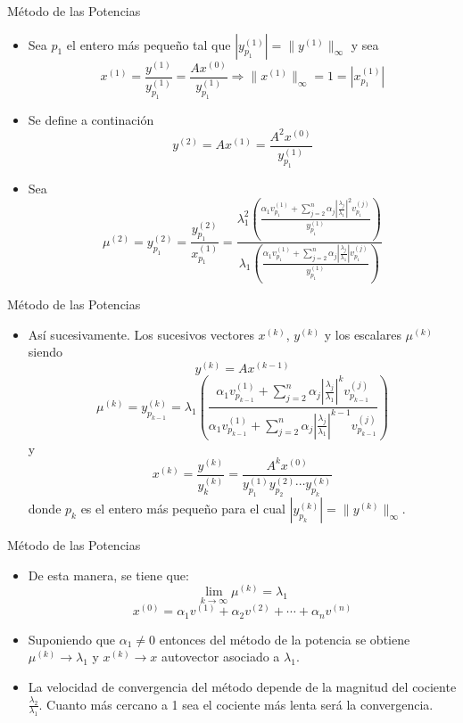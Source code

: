 \documentclass[11pt]{beamer}
\begin{document}
    \begin{frame}{M\'etodo de las Potencias}
      \begin{itemize}
        \item<1-> Sea $p_1$ el entero m\'as peque\~no tal que $|y_{p_1}^{(1)}|=\|y^{(1)}\|_{\infty}$ y sea
        $$
        x^{(1)} = \frac{y^{(1)}}{y_{p_1}^{(1)}} = \frac{Ax^{(0)}}{y_{p_1}^{(1)}} \Rightarrow \|x^{(1)}\|_{\infty} = 1 = |x_{p_1}^{(1)}|
        $$
        \item<2-> Se define a continaci\'on
        $$
        y^{(2)} = Ax^{(1)} = \frac{A^2x^{(0)}}{y_{p_1}^{(1)}}
        $$
        \item<3-> Sea
        $$
        \mu^{(2)} =  y_{p_1}^{(2)} =  \frac{y_{p_1}^{(2)}}{x_{p_1}^{(1)}} = \frac{\lambda_1^2\left(\displaystyle\frac{\alpha_1v_{p_1}^{(1)}+\sum_{j=2}^n\alpha_j\left|\frac{\lambda_j}{\lambda_1}\right|^2v_{p_1}^{(j)}}{y_{p_1}^{(1)}}\right)}{\lambda_1\left(\displaystyle\frac{\alpha_1v_{p_1}^{(1)}+\sum_{j=2}^n\alpha_j\left|\frac{\lambda_j}{\lambda_1}\right|v_{p_1}^{(j)}}{y_{p_1}^{(1)}}\right)}
        $$
      \end{itemize}
    \end{frame}
    \begin{frame}{M\'etodo de las Potencias}
      \begin{itemize}
        \item As\'i sucesivamente. Los sucesivos vectores $x^{(k)}$, $y^{(k)}$ y los escalares $\mu^{(k)}$ siendo
        $$
        y^{(k)} = Ax^{(k-1)}
        $$        
        $$
        \mu^{(k)} = y_{p_{k-1}}^{(k)} = \lambda_1\left(\frac{\alpha_1v_{p_{k-1}}^{(1)}+\sum_{j=2}^n\alpha_j\left|\frac{\lambda_j}{\lambda_1}\right|^kv_{p_{k-1}}^{(j)}}{\alpha_1v_{p_{k-1}}^{(1)}+\sum_{j=2}^n\alpha_j\left|\frac{\lambda_j}{\lambda_1}\right|^{k-1}v_{p_{k-1}}^{(j)}}\right)
        $$
        y
        $$
        x^{(k)} = \frac{y^{(k)}}{y_{k}^{(k)}} = \frac{A^kx^{(0)}}{y_{p_1}^{(1)} y_{p_2}^{(2)} \cdots y_{p_k}^{(k)}}
        $$
        donde $p_k$ es el entero m\'as peque\~no para el cual $|y_{p_k}^{(k)}|=\|y^{(k)}\|_{\infty}$.
      \end{itemize}
    \end{frame}
    \begin{frame}{M\'etodo de las Potencias}
      \begin{itemize}
        \item<1-> De esta manera, se tiene que:
        $$
        \lim_{k \to \infty}\mu^{(k)} = \lambda_1
        $$        
        $$
        x^{(0)} = \alpha_1v^{(1)} + \alpha_2v^{(2)}+\cdots+\alpha_nv^{(n)}
        $$
        \item<2-> Suponiendo que $\alpha_1 \neq 0$ entonces del m\'etodo de la potencia se obtiene $\mu^{(k)}\to\lambda_1$ y $x^{(k)}\to x$  autovector asociado a $\lambda_1$.
        \item<3-> La velocidad de convergencia del m\'etodo depende de la magnitud del cociente $\frac{\lambda_2}{\lambda_1}$. Cuanto m\'as cercano a 1 sea el cociente m\'as lenta ser\'a la convergencia.
      \end{itemize}
    \end{frame}
\end{document}
